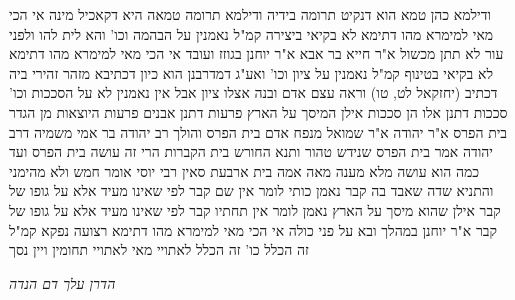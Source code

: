 \documentclass[12pt, openany]{book}
\begin{document}
{ודילמא כהן טמא הוא דנקיט תרומה בידיה ודילמא תרומה טמאה היא דקאכיל מינה 
אי הכי מאי למימרא מהו דתימא לא בקיאי ביצירה קמ"ל
נאמנין על הבהמה וכו' והא לית להו ולפני עור לא תתן מכשול א"ר חייא בר אבא א"ר יוחנן בגוזז ועובד 
אי הכי מאי למימרא מהו דתימא לא בקיאי בטינוף קמ"ל
נאמנין על ציון וכו' ואע"ג דמדרבנן הוא כיון דכתיבא מזהר זהירי ביה דכתיב (יחזקאל לט, טו) וראה עצם אדם ובנה אצלו ציון
אבל אין נאמנין לא על הסככות וכו' סככות דתנן אלו הן סככות אילן המיסך על הארץ פרעות דתנן אבנים פרעות היוצאות מן הגדר 
בית הפרס א"ר יהודה א"ר שמואל מנפח אדם בית הפרס והולך 
רב יהודה בר אמי משמיה דרב יהודה אמר בית הפרס שנידש טהור ותנא החורש בית הקברות הרי זה עושה בית הפרס ועד כמה הוא עושה מלא מענה מאה אמה בית ארבעת סאין רבי יוסי אומר חמש 
ולא מהימני והתניא שדה שאבד בה קבר נאמן כותי לומר אין שם קבר
לפי שאינו מעיד אלא על גופו של קבר אילן שהוא מיסך על הארץ נאמן לומר אין תחתיו קבר לפי שאינו מעיד אלא על גופו של קבר 
א"ר יוחנן במהלך ובא על פני כולה 
אי הכי מאי למימרא מהו דתימא רצועה נפקא קמ"ל
זה הכלל כו' זה הכלל לאתויי מאי לאתויי תחומין ויין נסך
\par \par {\large\emph{הדרן עלך דם הנדה}}\par \par }
\end{document}
